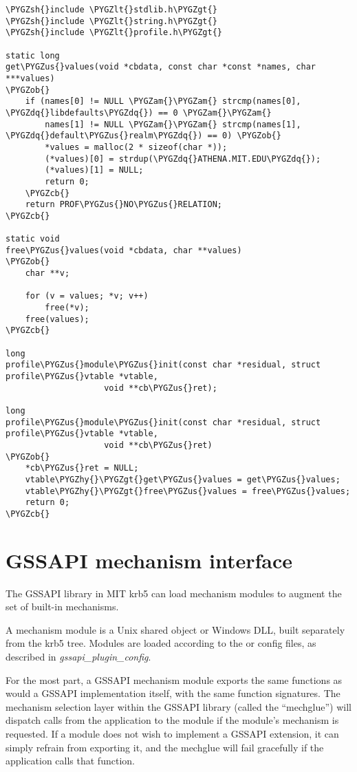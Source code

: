 \documentclass[letterpaper,10pt,english]{sphinxmanual}
\def\PYGZus{\char`\_}
\def\PYGZob{\char`\{}
\def\PYGZcb{\char`\}}
\def\PYGZam{\char`\&}
\def\PYGZlt{\char`\<}
\def\PYGZgt{\char`\>}
\def\PYGZsh{\char`\#}
\def\PYGZhy{\char`\-}
\def\PYGZdq{\char`\"}
\begin{document}
\begin{Verbatim}[commandchars=\\\{\}]
\PYGZsh{}include \PYGZlt{}stdlib.h\PYGZgt{}
\PYGZsh{}include \PYGZlt{}string.h\PYGZgt{}
\PYGZsh{}include \PYGZlt{}profile.h\PYGZgt{}

static long
get\PYGZus{}values(void *cbdata, const char *const *names, char ***values)
\PYGZob{}
    if (names[0] != NULL \PYGZam{}\PYGZam{} strcmp(names[0], \PYGZdq{}libdefaults\PYGZdq{}) == 0 \PYGZam{}\PYGZam{}
        names[1] != NULL \PYGZam{}\PYGZam{} strcmp(names[1], \PYGZdq{}default\PYGZus{}realm\PYGZdq{}) == 0) \PYGZob{}
        *values = malloc(2 * sizeof(char *));
        (*values)[0] = strdup(\PYGZdq{}ATHENA.MIT.EDU\PYGZdq{});
        (*values)[1] = NULL;
        return 0;
    \PYGZcb{}
    return PROF\PYGZus{}NO\PYGZus{}RELATION;
\PYGZcb{}

static void
free\PYGZus{}values(void *cbdata, char **values)
\PYGZob{}
    char **v;

    for (v = values; *v; v++)
        free(*v);
    free(values);
\PYGZcb{}

long
profile\PYGZus{}module\PYGZus{}init(const char *residual, struct profile\PYGZus{}vtable *vtable,
                    void **cb\PYGZus{}ret);

long
profile\PYGZus{}module\PYGZus{}init(const char *residual, struct profile\PYGZus{}vtable *vtable,
                    void **cb\PYGZus{}ret)
\PYGZob{}
    *cb\PYGZus{}ret = NULL;
    vtable\PYGZhy{}\PYGZgt{}get\PYGZus{}values = get\PYGZus{}values;
    vtable\PYGZhy{}\PYGZgt{}free\PYGZus{}values = free\PYGZus{}values;
    return 0;
\PYGZcb{}
\end{Verbatim}


\section{GSSAPI mechanism interface}
\label{plugindev/gssapi::doc}\label{plugindev/gssapi:gssapi-mechanism-interface}
The GSSAPI library in MIT krb5 can load mechanism modules to augment
the set of built-in mechanisms.

A mechanism module is a Unix shared object or Windows DLL, built
separately from the krb5 tree.  Modules are loaded according to the
 or  config files, as
described in \emph{gssapi\_plugin\_config}.

For the most part, a GSSAPI mechanism module exports the same
functions as would a GSSAPI implementation itself, with the same
function signatures.  The mechanism selection layer within the GSSAPI
library (called the ``mechglue'') will dispatch calls from the
application to the module if the module's mechanism is requested.  If
a module does not wish to implement a GSSAPI extension, it can simply
refrain from exporting it, and the mechglue will fail gracefully if
the application calls that function.
\end{document}
